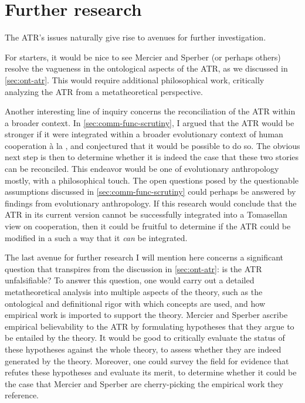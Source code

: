 \section{Further research}

The ATR's issues naturally give rise to avenues for further investigation.

For starters, it would be nice to see Mercier and Sperber (or perhaps others) resolve the vagueness in the ontological aspects of the ATR, as we discussed in \cref{sec:ont-atr}. This would require additional philosophical work, critically analyzing the ATR from a metatheoretical perspective.

Another interesting line of inquiry concerns the reconciliation of the ATR within a broader context. In \cref{sec:comm-func-scrutiny}, I argued that the ATR would be stronger if it were integrated within a broader evolutionary context of human cooperation à la \citet{Tomasello09}, and conjectured that it would be possible to do so. The obvious next step is then to determine whether it is indeed the case that these two stories can be reconciled. This endeavor would be one of evolutionary anthropology mostly, with a philosophical touch. The open questions posed by the questionable assumptions discussed in \cref{sec:comm-func-scrutiny} could perhaps be answered by findings from evolutionary anthropology.
If this research would conclude that the ATR in its current version cannot be successfully integrated into a Tomasellan view on cooperation, then it could be fruitful to determine if the ATR could be modified in a such a way that it \emph{can} be integrated.

The last avenue for further research I will mention here concerns a significant question that transpires from the discussion in \cref{sec:ont-atr}: is the ATR unfalsifiable?
To answer this question, one would carry out a detailed metatheoretical analysis into multiple aspects of the theory, such as the ontological and definitional rigor with which concepts are used, and how empirical work is imported to support the theory. Mercier and Sperber ascribe empirical believability to the ATR by formulating hypotheses that they argue to be entailed by the theory. It would be good to critically evaluate the status of these hypotheses against the whole theory, to assess whether they are indeed generated by the theory. Moreover, one could survey the field for evidence that refutes these hypotheses and evaluate its merit, to determine whether it could be the case that Mercier and Sperber are cherry-picking the empirical work they reference.

